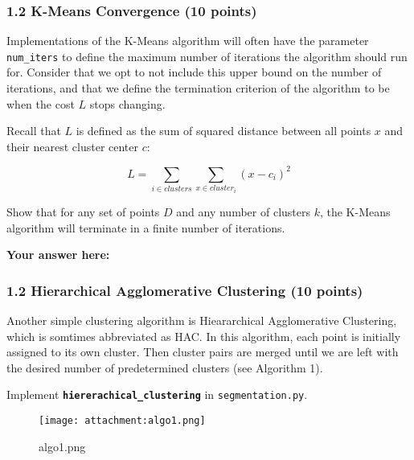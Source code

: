 \documentclass[11pt]{article}
\makeatletter
\def\maxwidth{\ifdim\Gin@nat@width>\linewidth\linewidth
    \else\Gin@nat@width\fi}
\let\Oldincludegraphics\includegraphics
\renewcommand{\includegraphics}[1]{\Oldincludegraphics[width=.8\maxwidth]{#1}}
\makeatother
\begin{document}
    \hypertarget{k-means-convergence-10-points}{%
\subsubsection{1.2 K-Means Convergence (10
points)}\label{k-means-convergence-10-points}}

Implementations of the K-Means algorithm will often have the parameter
\texttt{num\_iters} to define the maximum number of iterations the
algorithm should run for. Consider that we opt to not include this upper
bound on the number of iterations, and that we define the termination
criterion of the algorithm to be when the cost \(L\) stops changing.

Recall that \(L\) is defined as the sum of squared distance between all
points \(x\) and their nearest cluster center \(c\):

\[L = \sum_{i \in clusters}\sum_{x \in cluster_i} (x - c_i)^2\]

Show that for any set of points \textbf{\(D\)} and any number of
clusters \(k\), the K-Means algorithm will terminate in a finite number
of iterations.

    \textbf{Your answer here:}

    \hypertarget{hierarchical-agglomerative-clustering-10-points}{%
\subsubsection{1.2 Hierarchical Agglomerative Clustering (10
points)}\label{hierarchical-agglomerative-clustering-10-points}}

Another simple clustering algorithm is Hieararchical Agglomerative
Clustering, which is somtimes abbreviated as HAC. In this algorithm,
each point is initially assigned to its own cluster. Then cluster pairs
are merged until we are left with the desired number of predetermined
clusters (see Algorithm 1).

Implement \textbf{\texttt{hiererachical\_clustering}} in
\texttt{segmentation.py}.

\begin{figure}
\centering
\texttt{[image: attachment:algo1.png]}
\caption{algo1.png}
\end{figure}
\end{document}
